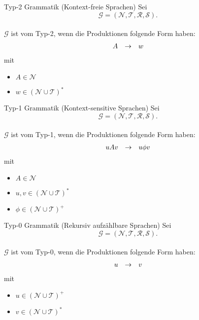 \documentclass[]{beamer}
\begin{document}
\begin{frame}[<+->][squeeze]{}
  \begin{block}{Typ-2 Grammatik (Kontext-freie Sprachen)}
    Sei 
    \[\mathcal{G = (N, T, R, S)}.\] \\
    $\mathcal{G}$ ist vom Typ-2, wenn die Produktionen folgende Form haben:
    \[\begin{array}{l c l}
        A & \rightarrow & w \\
      \end{array}\]
    mit
    \begin{itemize}
      \item<1-> $A \in \mathcal{N}$
      \item<1-> $w \in (\mathcal{N} \cup \mathcal{T})^*$
    \end{itemize}
  \end{block}
\end{frame}

\begin{frame}[<+->][squeeze]{}
  \begin{block}{Typ-1 Grammatik (Kontext-sensitive Sprachen)}
    Sei 
    \[\mathcal{G = (N, T, R, S)}.\] \\
    $\mathcal{G}$ ist vom Typ-1, wenn die Produktionen folgende Form haben:
    \[\begin{array}{l c l}
        uAv & \rightarrow & u \phi v \\
      \end{array}\]
    mit
    \begin{itemize}
      \item<1-> $A \in \mathcal{N}$
      \item<1-> $u, v \in (\mathcal{N} \cup \mathcal{T})^*$
      \item<1-> $\phi \in (\mathcal{N} \cup \mathcal{T})^+$
    \end{itemize}
  \end{block}
\end{frame}

\begin{frame}[<+->][squeeze]{}
  \begin{block}{Typ-0 Grammatik (Rekursiv aufzählbare Sprachen)}
    Sei 
    \[\mathcal{G = (N, T, R, S)}.\] \\
    $\mathcal{G}$ ist vom Typ-0, wenn die Produktionen folgende Form haben:
    \[\begin{array}{l c l}
        u & \rightarrow & v \\
      \end{array}\]
    mit
    \begin{itemize}
      \item<1-> $u \in (\mathcal{N} \cup \mathcal{T})^+$
      \item<1-> $v \in (\mathcal{N} \cup \mathcal{T})^*$
    \end{itemize}
  \end{block}
\end{frame}
\end{document}
